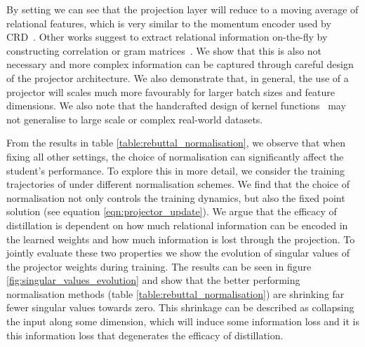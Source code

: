 \documentclass[letterpaper]{article} \usepackage[submission]{aaai23}  \usepackage{times}  \usepackage{helvet}  \usepackage{courier}  \usepackage[hyphens]{url}  \usepackage{graphicx} \urlstyle{rm} \def\UrlFont{\rm}  \usepackage{natbib}  \usepackage{caption} \frenchspacing  \setlength{\pdfpagewidth}{8.5in} \setlength{\pdfpageheight}{11in} \usepackage{algorithm}
\begin{document}
By setting  we can see that the projection layer will reduce to a moving average of relational features, which is very similar to the momentum encoder used by CRD~\cite{Tian2019ContrastiveDistillation}. Other works suggest to extract relational information on-the-fly by constructing correlation or gram matrices~\cite{Miles2022InformationDistillation, Peng2019CorrelationDistillation}. We show that this is also not necessary and more complex information can be captured through careful design of the projector architecture. We also demonstrate that, in general, the use of a projector will scales much more favourably for larger batch sizes and feature dimensions. We also note that the handcrafted design of kernel functions~\cite{Joshi2021OnNetworks, He2022FeatureDistillation, Miles2022InformationDistillation} may not generalise to large scale or complex real-world datasets.



From the results in table \ref{table:rebuttal_normalisation}, we observe that when fixing all other settings, the choice of normalisation can significantly affect the student's performance. To explore this in more detail, we consider the training trajectories of  under  different normalisation schemes. We find that the choice of normalisation not only controls the training dynamics, but also the fixed point solution (see equation \ref{eqn:projector_update}). We argue that the efficacy of distillation is dependent on how much relational information can be encoded in the learned weights and how much information is lost through the projection. To jointly evaluate these two properties we show the evolution of singular values of the projector weights during training. The results can be seen in figure \ref{fig:singular_values_evolution} and show that the better performing normalisation methods (table \ref{table:rebuttal_normalisation}) are shrinking far fewer singular values towards zero. This shrinkage can be described as collapsing the input along some dimension, which will induce some information loss and it is this information loss that degenerates the efficacy of distillation.
\end{document}
